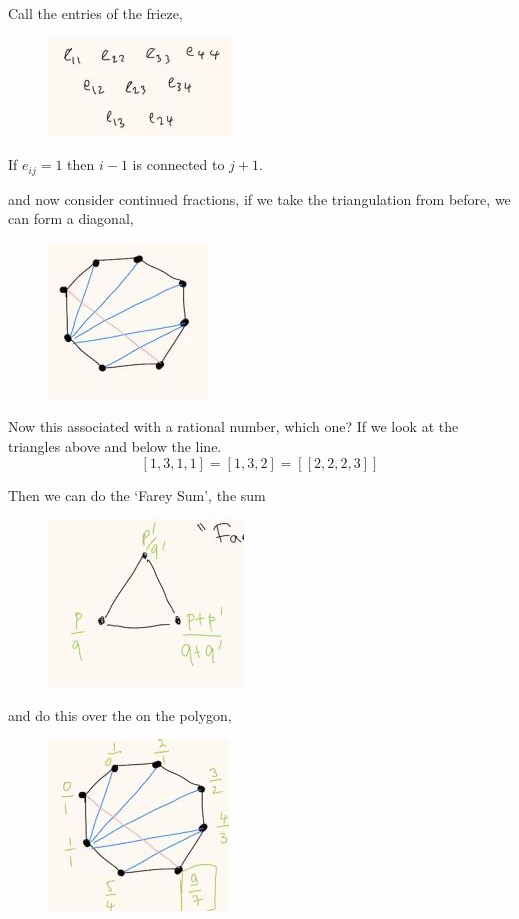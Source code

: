 \documentclass{article}
\begin{document}
Call the entries of the frieze,
\begin{figure}[!ht]
\centering
\includegraphics{./figures/L3.2}
\caption{}
\end{figure}

If $e_{ij} = 1$ then $i-1$ is connected to $j+1$.

and now consider continued fractions, if we take the triangulation from before, we can form a diagonal,
\begin{figure}[!ht]
\centering
\includegraphics{./figures/L3.3}
\end{figure}

Now this associated with a rational number, which one? If we look at the triangles above and below the line.
$$ [1, 3, 1,1] = [1, 3, 2] = [[2, 2, 2, 3]]$$

Then we can do the `Farey Sum', the sum

\begin{figure}[!ht]
\centering
\includegraphics{./figures/L3.4}
\end{figure}

and do this over the on the polygon,

\begin{figure}[!ht]
\centering
\includegraphics{./figures/L3.5}
\end{figure}
\end{document}
